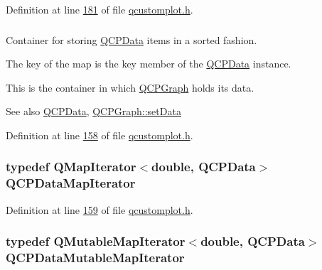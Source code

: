 Definition at line \hyperlink{a00116_source_l00181}{181} of file \hyperlink{a00116_source}{qcustomplot.\+h}.

\hypertarget{a00116_a84a9c4a4c2216ccfdcb5f3067cda76e3}{
\subsubsection[{Q\+C\+P\+Data\+Map}]{}}\label{a00116_a84a9c4a4c2216ccfdcb5f3067cda76e3}


Container for storing \hyperlink{a00030_d2/d94/a00184}{Q\+C\+P\+Data} items in a sorted fashion. 

The key of the map is the key member of the \hyperlink{a00030_d2/d94/a00184}{Q\+C\+P\+Data} instance.

This is the container in which \hyperlink{a00031}{Q\+C\+P\+Graph} holds its data. \begin{DoxySeeAlso}{See also}
\hyperlink{a00030_d2/d94/a00184}{Q\+C\+P\+Data}, \hyperlink{a00031_a1df2fd710545c8ba3b2c99a39a27bf8b}{Q\+C\+P\+Graph\+::set\+Data} 
\end{DoxySeeAlso}


Definition at line \hyperlink{a00116_source_l00158}{158} of file \hyperlink{a00116_source}{qcustomplot.\+h}.

\hypertarget{a00116_a0fd9a83e0a1783a82f439b0e200b6ae5}{
\subsubsection[{Q\+C\+P\+Data\+Map\+Iterator}]{\setlength{\rightskip}{0pt plus 5cm}typedef Q\+Map\+Iterator$<$double, {\bf Q\+C\+P\+Data}$>$ {\bf Q\+C\+P\+Data\+Map\+Iterator}}}\label{a00116_a0fd9a83e0a1783a82f439b0e200b6ae5}


Definition at line \hyperlink{a00116_source_l00159}{159} of file \hyperlink{a00116_source}{qcustomplot.\+h}.

\hypertarget{a00116_a4798b07422d0d4c46a8665c23958b0ea}{
\subsubsection[{Q\+C\+P\+Data\+Mutable\+Map\+Iterator}]{\setlength{\rightskip}{0pt plus 5cm}typedef Q\+Mutable\+Map\+Iterator$<$double, {\bf Q\+C\+P\+Data}$>$ {\bf Q\+C\+P\+Data\+Mutable\+Map\+Iterator}}}\label{a00116_a4798b07422d0d4c46a8665c23958b0ea}


